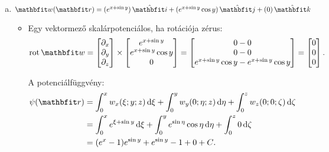 \documentclass{szb-solution}
\begin{document}
\begin{enumerate}[a)]
  \item $\rvec w(\coordvec) = \ijk{e^{x + \sin y}}{e^{x + \sin y} \cos y}{0}$
        \begin{itemize}
          \item Egy vektormező skalárpotenciálos, ha rotációja zérus:
                $$
                  \rot \rvec w
                  =
                  \begin{bmatrix}
                    \partial_x \\ \partial_y \\ \partial_z
                  \end{bmatrix}
                  \times
                  \begin{bmatrix}
                    e^{x + \sin y} \\ e^{x + \sin y} \cos y \\ 0
                  \end{bmatrix}
                  =
                  \begin{bmatrix}
                    0 - 0 \\ 0 - 0 \\ e^{x + \sin y} \cos y - e^{x + \sin y} \cos y
                  \end{bmatrix}
                  =
                  \begin{bmatrix}
                    0 \\ 0 \\ 0
                  \end{bmatrix}
                  \text.
                $$

                A potenciálfüggvény:
                \begin{align*}
                  \psi(\coordvec)
                   & =
                  \int_0^x w_x(\xi; y; z) \dd \xi +
                  \int_0^y w_y(0; \eta; z) \dd \eta +
                  \int_0^z w_z(0; 0; \zeta) \dd \zeta
                  \\
                   & =
                  \int_0^x e^{\xi + \sin y} \dd \xi +
                  \int_0^y e^{\sin \eta} \cos \eta \dd \eta +
                  \int_0^z 0 \dd \zeta
                  \\
                   & =
                  (e^x - 1) e^{\sin y} + e^{\sin y} - 1 + 0 + C
                  \text.
                \end{align*}


\end{itemize}
\end{enumerate}
\end{document}

